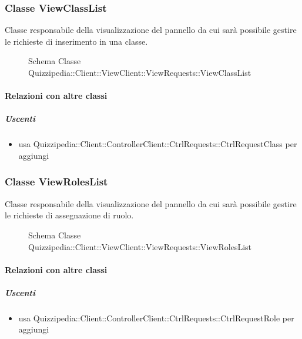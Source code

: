 \subsubsection{Classe ViewClassList}
Classe responsabile della visualizzazione del pannello da cui sarà possibile gestire le richieste di inserimento in una classe.
\begin{figure}[H]
\centering
\noindent{}
\caption[Schema Classe ViewClassList]{Schema Classe Quizzipedia::Client::ViewClient::ViewRequests::ViewClassList}
\end{figure}
\paragraph{Relazioni con altre classi}
\subparagraph{Uscenti}
\begin{itemize}
\item usa Quizzipedia::Client::ControllerClient::CtrlRequests::CtrlRequestClass per aggiungi
\end{itemize}
\subsubsection{Classe ViewRolesList}
Classe responsabile della visualizzazione del pannello da cui sarà possibile gestire le richieste di assegnazione di ruolo.
\begin{figure}[H]
\centering
\noindent{}
\caption[Schema Classe ViewRolesList]{Schema Classe Quizzipedia::Client::ViewClient::ViewRequests::ViewRolesList}
\end{figure}
\paragraph{Relazioni con altre classi}
\subparagraph{Uscenti}
\begin{itemize}
\item usa Quizzipedia::Client::ControllerClient::CtrlRequests::CtrlRequestRole per aggiungi
\end{itemize}
